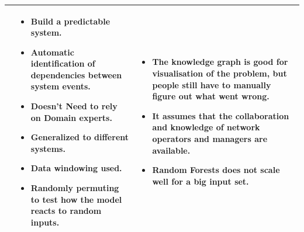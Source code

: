 \begin{longtable}{| p{25mm} | p{62mm} | p{62mm} |}
    \cite{gonzalez2017root} &
    \vspace{-8mm}
    \begin{itemize}[leftmargin=3mm,noitemsep,nolistsep] 
        \item Build a predictable system.
        \item Automatic identification of dependencies between system events.
        \item Doesn't Need to rely on Domain experts.
        \item Generalized to different systems.
        \item Data windowing used.
        \item Randomly permuting to test how the model reacts to random inputs.
        \vspace{-7mm}
    \end{itemize} &
    \vspace{-8mm}
    \begin{itemize}[leftmargin=3mm,noitemsep,nolistsep] 
        \item The knowledge graph is good for visualisation of the problem, but people still have to manually figure out what went wrong.
        \item It assumes that the collaboration and knowledge of network operators and managers are available.
        \item Random Forests does not scale well for a big input set.
        \vspace{-7mm}
    \end{itemize} \\ \hline
    

\end{longtable}
